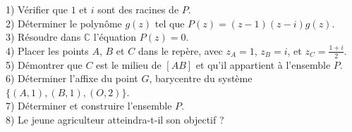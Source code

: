\documentclass[12pt]{article}
\begin{document}
1) Vérifier que \(1\) et \(i\) sont des racines de \(P\). \\
2) Déterminer le polynôme \( g(z) \) tel que \( P(z) = (z-1)(z-i)g(z) \). \\
3) Résoudre dans \( \mathbb{C} \) l'équation \( P(z) = 0 \). \\
4) Placer les points \( A \), \( B \) et \( C \) dans le repère, avec \( z_A = 1 \), \( z_B = i \), et \( z_C = \frac{1+i}{2} \). \\
5) Démontrer que \( C \) est le milieu de \( [AB] \) et qu'il appartient à l'ensemble \( P \). \\
6) Déterminer l'affixe du point \( G \), barycentre du système \( \{(A,1), (B,1), (O,2)\} \). \\
7) Déterminer et construire l'ensemble \( P \). \\
8) Le jeune agriculteur atteindra-t-il son objectif ?


\end{document}
